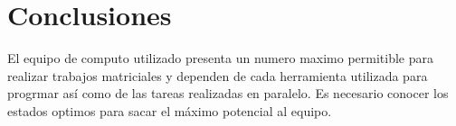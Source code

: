 \documentclass{article}
\begin{document}
\section{Conclusiones}
El equipo de computo utilizado presenta un numero maximo permitible para realizar trabajos matriciales y dependen de cada herramienta utilizada para progrmar así como de las tareas realizadas en paralelo. Es necesario conocer los estados optimos para sacar el máximo potencial al equipo.
\end{document}
